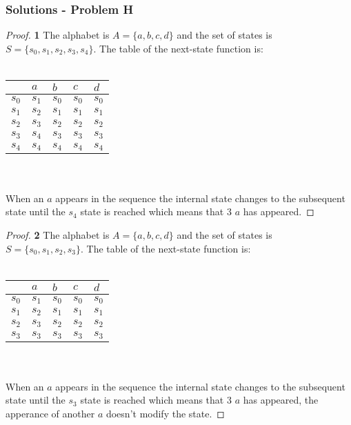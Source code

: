 \documentclass[11pt]{article}
\begin{document}
 	\subsubsection*{Solutions - Problem H}
		\begin{proof}{\textbf{1}}
			The alphabet is $A = \{a,b,c,d\}$ and the set of states is \\$S = \{s_0,s_1,s_2,s_3,s_4\}$. The table of the next-state function is: \\\\
			\begin{adjustbox}{max width=\textwidth,center}
			\begin{tabular}{l|llll}
				      & $a$ & $b$ & $c$ & $d$ \\ \hline
				$s_0$ & $s_1$ & $s_0$ & $s_0$ & $s_0$ \\
				$s_1$ & $s_2$ & $s_1$ & $s_1$ & $s_1$ \\
				$s_2$ & $s_3$ & $s_2$ & $s_2$ & $s_2$ \\
				$s_3$ & $s_4$ & $s_3$ & $s_3$ & $s_3$ \\
				$s_4$ & $s_4$ & $s_4$ & $s_4$ & $s_4$ \\
			\end{tabular}
			\end{adjustbox}\\\\
			When an $a$ appears in the sequence the internal state changes to the subsequent state until the  $s_4$ state is reached which means that 3 $a$ has appeared.
		\end{proof}
		\begin{proof}{\textbf{2}}
			The alphabet is $A = \{a,b,c,d\}$ and the set of states is \\$S = \{s_0,s_1,s_2,s_3\}$. The table of the next-state function is: \\\\
			\begin{adjustbox}{max width=\textwidth,center}
			\begin{tabular}{l|llll}
				      & $a$ & $b$ & $c$ & $d$ \\ \hline
				$s_0$ & $s_1$ & $s_0$ & $s_0$ & $s_0$ \\
				$s_1$ & $s_2$ & $s_1$ & $s_1$ & $s_1$ \\
				$s_2$ & $s_3$ & $s_2$ & $s_2$ & $s_2$ \\
				$s_3$ & $s_3$ & $s_3$ & $s_3$ & $s_3$ \\
			\end{tabular}
			\end{adjustbox}\\\\
			When an $a$ appears in the sequence the internal state changes to the subsequent state until the  $s_3$ state is reached which means that 3 $a$ has appeared, the apperance of another $a$ doesn't modify the state.
		\end{proof}
\end{document}
